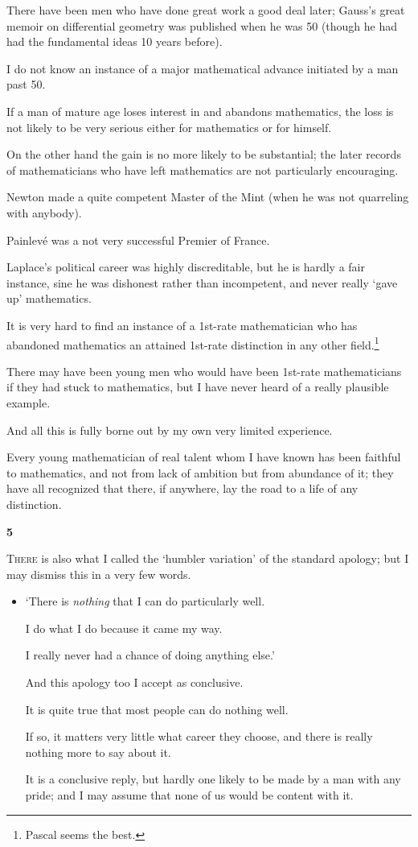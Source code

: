 \documentclass{article}
\numberwithin{equation}{section}
\begin{document}
There have been men who have done great work a good deal later; Gauss's great memoir on differential geometry was published when he was 50 (though he had had the fundamental ideas 10 years before).

I do not know an instance of a major mathematical advance initiated by a man past 50.

If a man of mature age loses interest in and abandons mathematics, the loss is not likely to be very serious either for mathematics or for himself.

%
On the other hand the gain is no more likely to be substantial; the later records of mathematicians who have left mathematics are not particularly encouraging.

Newton made a quite competent Master of the Mint (when he was not quarreling with anybody).

Painlev\'e was a not very successful Premier of France.

Laplace's political career was highly discreditable, but he is hardly a fair instance, sine he was dishonest rather than incompetent, and never really `gave up' mathematics.

It is very hard to find an instance of a 1st-rate mathematician who has abandoned mathematics an attained 1st-rate distinction in any other field.\footnote{Pascal seems the best.}

There may have been young men who would have been 1st-rate mathematicians if they had stuck to mathematics, but I have never heard of a really plausible example.

And all this is fully borne out by my own very limited experience.

Every young mathematician of real talent whom I have known has been faithful to mathematics, and not from lack of ambition but from abundance of it; they have all recognized that there, if anywhere, lay the road to a life of any distinction. 

\begin{center}
    \large\textbf{5}
\end{center}
\textsc{There} is also what I called the `humbler variation' of the standard apology; but I may dismiss this in a very few words.
\begin{itemize}
    \item[(2)] `There is \textit{nothing} that I can do particularly well.
    
    I do what I do because it came my way.
    
    I really never had a chance of doing anything else.'
    
    And this apology too I accept as conclusive.
    
    It is quite true that most people can do nothing well.
    
    If so, it matters very little what career they choose, and there is really nothing more to say about it.
    
    It is a conclusive reply, but hardly one likely to be made by a man with any pride; and I may assume that none of us would be content with it.
\end{itemize}
\end{document}
